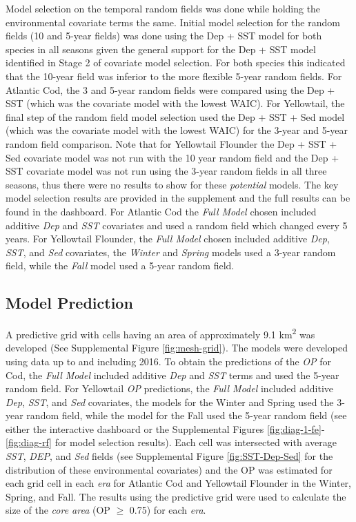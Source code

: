 \documentclass[
]{article}
\begin{document}
Model selection on the temporal random fields was done while holding the environmental covariate terms the same. Initial model selection for the random fields (10 and 5-year fields) was done using the Dep + SST model for both species in all seasons given the general support for the Dep + SST model identified in Stage 2 of covariate model selection. For both species this indicated that the 10-year field was inferior to the more flexible 5-year random fields. For Atlantic Cod, the 3 and 5-year random fields were compared using the Dep + SST (which was the covariate model with the lowest WAIC). For Yellowtail, the final step of the random field model selection used the Dep + SST + Sed model (which was the covariate model with the lowest WAIC) for the 3-year and 5-year random field comparison. Note that for Yellowtail Flounder the Dep + SST + Sed covariate model was not run with the 10 year random field and the Dep + SST covariate model was not run using the 3-year random fields in all three seasons, thus there were no results to show for these \emph{potential} models. The key model selection results are provided in the supplement and the full results can be found in the dashboard. For Atlantic Cod the \emph{Full Model} chosen included additive \emph{Dep} and \emph{SST} covariates and used a random field which changed every 5 years. For Yellowtail Flounder, the \emph{Full Model} chosen included additive \emph{Dep}, \emph{SST}, and \emph{Sed} covariates, the \emph{Winter} and \emph{Spring} models used a 3-year random field, while the \emph{Fall} model used a 5-year random field.

\hypertarget{model-prediction}{%
\subsection{Model Prediction}\label{model-prediction}}

A predictive grid with cells having an area of approximately 9.1 km\textsuperscript{2} was developed (See Supplemental Figure \ref{fig:mesh-grid}). The models were developed using data up to and including 2016. To obtain the predictions of the \emph{OP} for Cod, the \emph{Full Model} included additive \emph{Dep} and \emph{SST} terms and used the 5-year random field. For Yellowtail \emph{OP} predictions, the \emph{Full Model} included additive \emph{Dep}, \emph{SST}, and \emph{Sed} covariates, the models for the Winter and Spring used the 3-year random field, while the model for the Fall used the 5-year random field (see either the interactive dashboard or the Supplemental Figures \ref{fig:diag-1-fe}-\ref{fig:diag-rf} for model selection results). Each cell was intersected with average \emph{SST}, \emph{DEP}, and \emph{Sed} fields (see Supplemental Figure \ref{fig:SST-Dep-Sed} for the distribution of these environmental covariates) and the OP was estimated for each grid cell in each \emph{era} for Atlantic Cod and Yellowtail Flounder in the Winter, Spring, and Fall. The results using the predictive grid were used to calculate the size of the \emph{core area} (OP \(\geq\) 0.75) for each \emph{era}.
\end{document}
